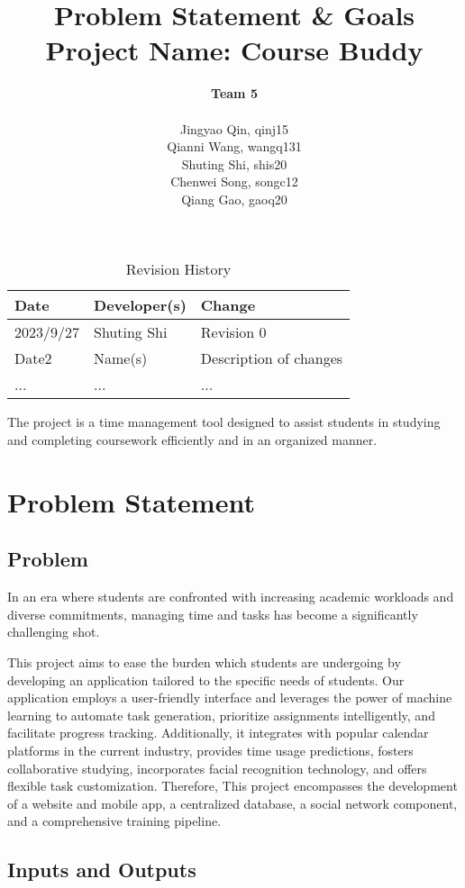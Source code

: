 \documentclass{article}
\title{\textbf{Problem Statement \& Goals}\\\textbf{Project Name: Course Buddy}}
\author{\textbf{Team 5} \\ \\ Jingyao Qin, qinj15\\ Qianni Wang, wangq131\\ Shuting Shi, shis20\\ Chenwei Song, songc12\\  Qiang Gao, gaoq20}
\date{}
\begin{document}
\maketitle

\begin{table}[hp]
\caption{Revision History} \label{TblRevisionHistory}
\begin{tabularx}{\textwidth}{llX}
\toprule
\textbf{Date} & \textbf{Developer(s)} & \textbf{Change}\\
\midrule
2023/9/27 & Shuting Shi  & Revision 0\\
Date2 & Name(s) & Description of changes\\
... & ... & ...\\
\bottomrule
\end{tabularx}
\end{table}

The project is a time management tool designed to assist students in studying and completing coursework efficiently and in an organized manner.

\section{Problem Statement}

\subsection{Problem}

    In an era where students are confronted with increasing academic workloads and diverse commitments, managing time and tasks has become a significantly challenging shot.

    This project aims to ease the burden which students are undergoing by developing an application tailored to the specific needs of students. Our application employs a user-friendly interface and leverages the power of machine learning to automate task generation, prioritize assignments intelligently, and facilitate progress tracking. Additionally, it integrates with popular calendar platforms in the current industry, provides time usage predictions, fosters collaborative studying, incorporates facial recognition technology, and offers flexible task customization. Therefore, This project encompasses the development of a website and mobile app, a centralized database, a social network component, and a comprehensive training pipeline.
\subsection{Inputs and Outputs}
\end{document}
